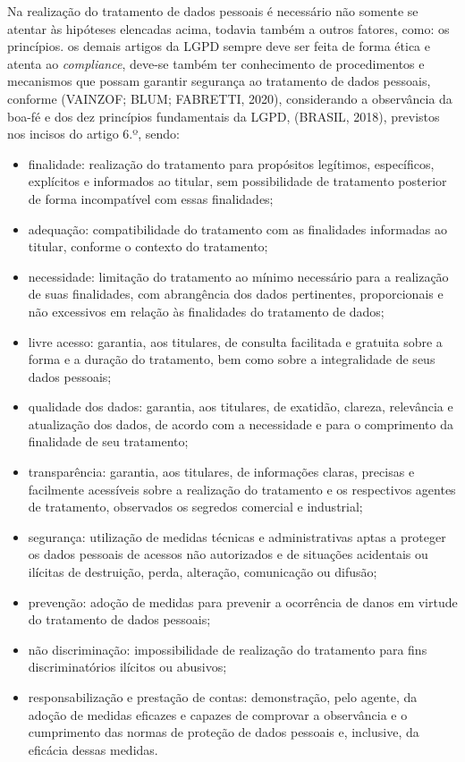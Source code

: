 \documentclass[
	12pt,				%
	openright,			%
	oneside,			%
	a4paper,			%
	english,			%
	french,				%
	spanish,			%
	brazil,				%
	]{abntex2}
\begin{document}
Na realização do tratamento de dados pessoais é necessário não somente se atentar às hipóteses elencadas acima, todavia também a outros fatores, como: os princípios. os demais artigos da LGPD sempre deve ser feita de forma ética e atenta ao \textit{compliance}, deve-se também ter conhecimento de procedimentos e mecanismos que possam garantir segurança ao tratamento de dados pessoais, conforme (VAINZOF; BLUM; FABRETTI, 2020), considerando a observância da boa-fé e dos dez princípios fundamentais da LGPD, (BRASIL, 2018), previstos nos incisos do artigo 6.º, sendo:

\begin{itemize}
\item finalidade: realização do tratamento para propósitos legítimos, específicos, explícitos e informados ao titular, sem possibilidade de tratamento posterior de forma incompatível com essas finalidades;
\item adequação: compatibilidade do tratamento com as finalidades informadas ao titular, conforme o contexto do tratamento;
\item necessidade: limitação do tratamento ao mínimo necessário para a realização de suas finalidades, com abrangência dos dados pertinentes, proporcionais e não excessivos em relação às finalidades do tratamento de dados;
\item livre acesso: garantia, aos titulares, de consulta facilitada e gratuita sobre a forma e a duração do tratamento, bem como sobre a integralidade de seus dados pessoais;
\item qualidade dos dados: garantia, aos titulares, de exatidão, clareza, relevância e atualização dos dados, de acordo com a necessidade e para o comprimento da finalidade de seu tratamento;
\item transparência: garantia, aos titulares, de informações claras, precisas e facilmente acessíveis sobre a realização do tratamento e os respectivos agentes de tratamento, observados os segredos comercial e industrial;
\item segurança: utilização de medidas técnicas e administrativas aptas a proteger os dados pessoais de acessos não autorizados e de situações acidentais ou ilícitas de destruição, perda, alteração, comunicação ou difusão;
\item prevenção: adoção de medidas para prevenir a ocorrência de danos em virtude do tratamento de dados pessoais;
\item não discriminação: impossibilidade de realização do tratamento para fins discriminatórios ilícitos ou abusivos; 
\item responsabilização e prestação de contas: demonstração, pelo agente, da adoção de medidas eficazes e capazes de comprovar a observância e o cumprimento das normas de proteção de dados pessoais e, inclusive, da eficácia dessas medidas.
\end{itemize}
\end{document}
